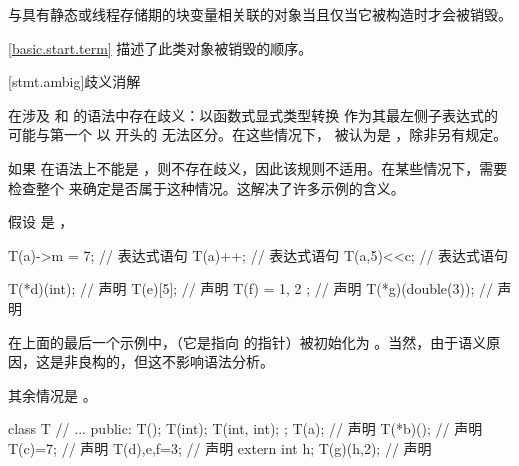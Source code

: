 \pnum
{}%
与具有静态或线程存储期的块变量相关联的对象当且仅当它被构造时才会被销毁。
\begin{note}
\ref{basic.start.term} 描述了此类对象被销毁的顺序。
\end{note}

[stmt.ambig]{歧义消解}%

\pnum
在涉及  和  的语法中存在歧义：以函数式显式类型转换 作为其最左侧子表达式的  可能与第一个  以 \tcode{(} 开头的  无法区分。在这些情况下， 被认为是 ，除非另有规定。

\pnum
\begin{note}
如果  在语法上不能是 ，则不存在歧义，因此该规则不适用。在某些情况下，需要检查整个  来确定是否属于这种情况。这解决了许多示例的含义。
\begin{example}
假设  是 ，

\begin{codeblock}
T(a)->m = 7;        // 表达式语句
T(a)++;             // 表达式语句
T(a,5)<<c;          // 表达式语句

T(*d)(int);         //  声明
T(e)[5];            //  声明
T(f) = { 1, 2 };    //  声明
T(*g)(double(3));   //  声明
\end{codeblock}

在上面的最后一个示例中，（它是指向  的指针）被初始化为 。当然，由于语义原因，这是非良构的，但这不影响语法分析。
\end{example}

其余情况是 。
\begin{example}
\begin{codeblock}
class T {
  // ...
public:
  T();
  T(int);
  T(int, int);
};
T(a);               //  声明
T(*b)();            //  声明
T(c)=7;             //  声明
T(d),e,f=3;         //  声明
extern int h;
T(g)(h,2);          //  声明
\end{codeblock}
\end{example}
\end{note}

